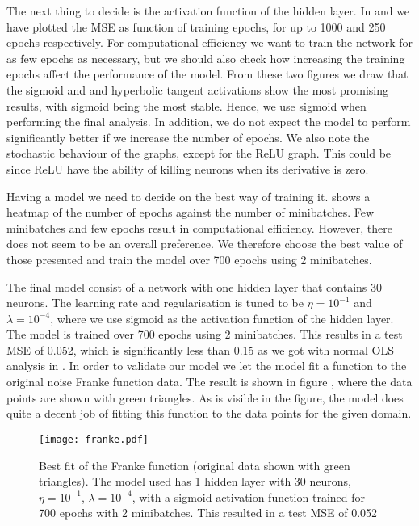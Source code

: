     The next thing to decide is the activation function of the hidden layer. In  and  we have plotted the MSE as function of training epochs, for up to 1000 and 250 epochs respectively. For computational efficiency we want to train the network for as few epochs as necessary, but we should also check how increasing the training epochs affect the performance of the model. From these two figures we draw that the sigmoid and and hyperbolic tangent activations show the most promising results, with sigmoid being the most stable. Hence, we use sigmoid when performing the final analysis. In addition, we do not expect the model to perform significantly better if we increase the number of epochs. We also note the stochastic behaviour of the graphs, except for the ReLU graph. This could be since ReLU have the ability of killing neurons when its derivative is zero. 

    Having a model we need to decide on the best way of training it.  shows a heatmap of the number of epochs against the number of minibatches. Few minibatches and few epochs result in computational efficiency. However, there does not seem to be an overall preference. We therefore choose the best value of those presented and train the model over 700 epochs using 2 minibatches. 

    The final model consist of a network with one hidden layer that contains 30 neurons. The learning rate and regularisation is tuned to be $\eta=10^{-1}$ and $\lambda=10^{-4}$, where we use sigmoid as the activation function of the hidden layer. The model is trained over 700 epochs using 2 minibatches. This results in a test MSE of 0.052, which is significantly less than 0.15 as we got with normal OLS analysis in \projectOne. In order to validate our model we let the model fit a function to the original noise Franke function data. The result is shown in figure , where the data points are shown with green triangles. As is visible in the figure, the model does quite a decent job of fitting this function to the data points for the given domain. 

    \begin{figure}[h!]
        \texttt{[image: franke.pdf]}
        \caption{Best fit of the Franke function (original data shown with green triangles). The model used has 1 hidden layer with 30 neurons, $\eta=10^{-1}$, $\lambda=10^{-4}$, with a sigmoid activation function trained for 700 epochs with 2 minibatches. This resulted in a test MSE of 0.052}
        \label{fig:franke}
    \end{figure}

